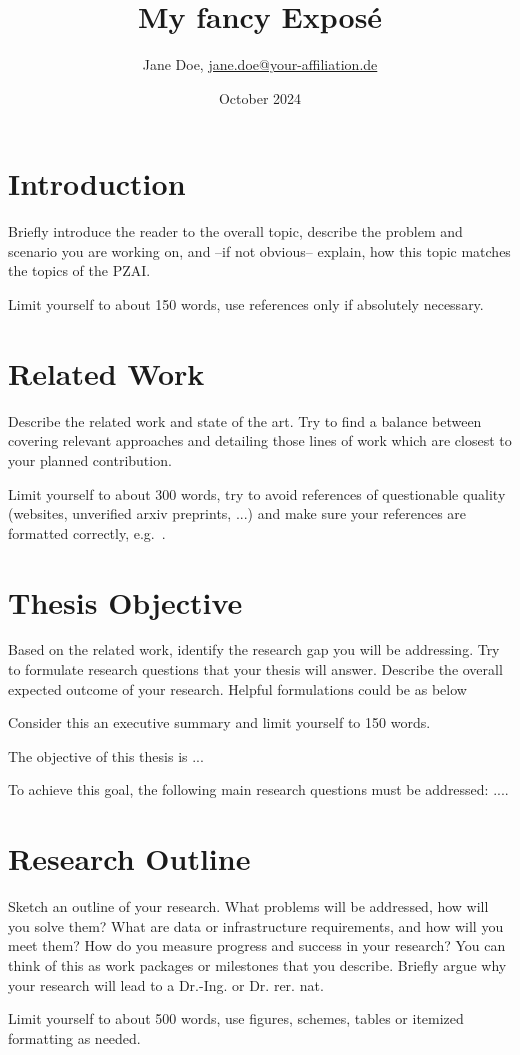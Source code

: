 \documentclass[11pt,DIV=16,parskip=half]{scrartcl}
\title{My fancy Exposé}
\author{Jane Doe, \href{mailto:jane.doe@your-affiliation.de}{jane.doe@your-affiliation.de}}
\date{October 2024}
\begin{document}
\maketitle

\section{Introduction}
Briefly introduce the reader to the overall topic, describe the problem and scenario you are working on, and --if not obvious-- explain, how this topic matches the topics of the PZAI.

Limit yourself to about 150 words, use references only if absolutely necessary.



\section{Related Work}
Describe the related work and state of the art.
Try to find a balance between covering relevant approaches and detailing those lines of work which are closest to your planned contribution.

Limit yourself to about 300 words, try to avoid references of questionable quality (websites, unverified arxiv preprints, ...) and make sure your references are formatted correctly, e.g.~\cite{cooley1965-fft}.



\section{Thesis Objective}
Based on the related work, identify the research gap you will be addressing.
Try to formulate research questions that your thesis will answer.
Describe the overall expected outcome of your research.
Helpful formulations could be as below

Consider this an executive summary and limit yourself to 150 words.

The objective of this thesis is ...

To achieve this goal, the following main research questions must be addressed: ....


\section{Research Outline}
Sketch an outline of your research.
What problems will be addressed, how will you solve them?
What are data or infrastructure requirements, and how will you meet them?
How do you measure progress and success in your research?
You can think of this as work packages or milestones that you describe.
Briefly argue why your research will lead to a Dr.-Ing. or Dr. rer. nat.

Limit yourself to about 500 words, use figures, schemes, tables or itemized formatting as needed.



\printbibliography
\end{document}
